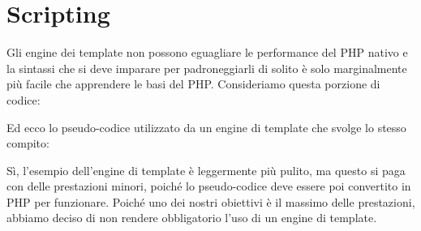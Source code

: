 \section{Scripting}
\label{cap:script}

Gli engine dei template non possono eguagliare le performance del \ac{PHP} nativo e la sintassi che si deve imparare per padroneggiarli di solito è solo marginalmente più facile che apprendere le basi del \ac{PHP}. Consideriamo questa porzione di codice:


Ed ecco lo pseudo-codice utilizzato da un engine di template che svolge lo stesso compito:


Sì, l'esempio dell'engine di template è leggermente più pulito, ma questo si paga con delle prestazioni minori, poiché lo pseudo-codice deve essere poi convertito in \ac{PHP} per funzionare. Poiché uno dei nostri obiettivi è il massimo delle prestazioni, abbiamo deciso di non rendere obbligatorio l'uso di un engine di template.